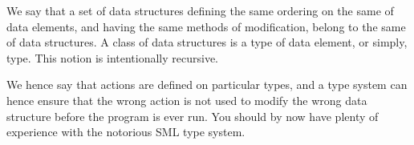 We say that a set of data structures defining the same ordering on the same
 of data elements, and having the same methods of modification,
belong to the same  of data structures. A class of data structures
is a type of data element, or simply, type. This notion is intentionally
recursive.

We hence say that actions are defined on particular types, and a type system
can hence ensure that the wrong action is not used to modify the wrong data
structure before the program is ever run. You should by now have plenty of
experience with the notorious SML type system.









